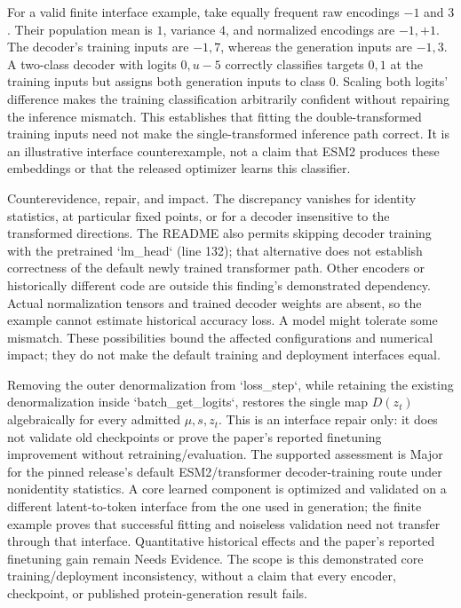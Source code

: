 \documentclass[10pt]{article}
\begin{document}
For a valid finite interface example, take equally frequent raw encodings \(-1\) and \(3\). Their population mean is \(1\), variance \(4\), and normalized encodings are \(-1,+1\). The decoder’s training inputs are \(-1,7\), whereas the generation inputs are \(-1,3\). A two-class decoder with logits \(0,u-5\) correctly classifies targets \(0,1\) at the training inputs but assigns both generation inputs to class \(0\). Scaling both logits’ difference makes the training classification arbitrarily confident without repairing the inference mismatch. This establishes that fitting the double-transformed training inputs need not make the single-transformed inference path correct. It is an illustrative interface counterexample, not a claim that ESM2 produces these embeddings or that the released optimizer learns this classifier.\par
Counterevidence, repair, and impact. The discrepancy vanishes for identity statistics, at particular fixed points, or for a decoder insensitive to the transformed directions. The README also permits skipping decoder training with the pretrained `lm\_head` (line 132); that alternative does not establish correctness of the default newly trained transformer path. Other encoders or historically different code are outside this finding’s demonstrated dependency. Actual normalization tensors and trained decoder weights are absent, so the example cannot estimate historical accuracy loss. A model might tolerate some mismatch. These possibilities bound the affected configurations and numerical impact; they do not make the default training and deployment interfaces equal.\par
Removing the outer denormalization from `loss\_step`, while retaining the existing denormalization inside `batch\_get\_logits`, restores the single map \(D(z_t)\) algebraically for every admitted \(\mu,s,z_t\). This is an interface repair only: it does not validate old checkpoints or prove the paper’s reported finetuning improvement without retraining/evaluation. The supported assessment is Major for the pinned release’s default ESM2/transformer decoder-training route under nonidentity statistics. A core learned component is optimized and validated on a different latent-to-token interface from the one used in generation; the finite example proves that successful fitting and noiseless validation need not transfer through that interface. Quantitative historical effects and the paper’s reported finetuning gain remain Needs Evidence. The scope is this demonstrated core training/deployment inconsistency, without a claim that every encoder, checkpoint, or published protein-generation result fails.\par
\end{document}
